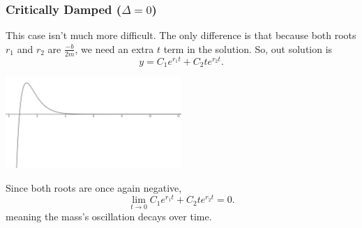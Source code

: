 \subsubsection{Critically Damped ($\Delta = 0$)}
This case isn't much more difficult.
The only difference is that because both roots $r_1$ and $r_2$ are $\frac{-b}{2m}$, we need an extra $t$ term in the solution. So, out solution is
\begin{equation*}
	y = C_1e^{r_1 t} + C_2te^{r_2 t}.
\end{equation*}
\begin{center}
	\includegraphics[width=0.5\textwidth]{./higherOrder/freeVibrs/criticallydamped.png}
\end{center}
Since both roots are once again negative,
\begin{equation*}
\lim\limits_{t \to 0}{C_1e^{r_1 t} + C_2te^{r_2 t}} = 0.
\end{equation*}
meaning the mass's oscillation decays over time.